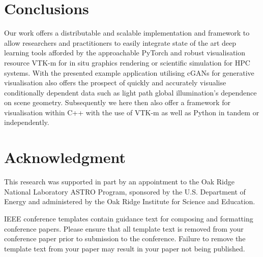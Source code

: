 \documentclass[conference]{IEEEtran}
\begin{document}
\section{Conclusions}

Our work offers a distributable and scalable implementation and framework to allow researchers and practitioners to easily integrate state of the art deep learning tools afforded by the approachable PyTorch and robust visualisation resource VTK-m for in situ graphics rendering or scientific simulation for HPC systems. With the presented example application utilising cGANs for generative visualisation also offers the prospect of quickly and accurately visualise conditionally dependent data such as light path global illumination's dependence on scene geometry. Subsequently we here then also offer a framework for visualisation within C++ with the use of VTK-m as well as Python in tandem or independently. 


\section*{Acknowledgment}
 This research was supported in part by an appointment to the Oak Ridge National Laboratory ASTRO Program, sponsored by the U.S. Department of Energy and administered by the Oak Ridge Institute for Science and Education.





\vspace{12pt}
\color{red}
IEEE conference templates contain guidance text for composing and formatting conference papers. Please ensure that all template text is removed from your conference paper prior to submission to the conference. Failure to remove the template text from your paper may result in your paper not being published.
\end{document}
